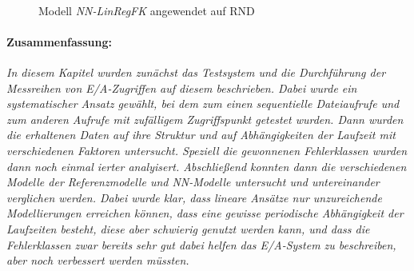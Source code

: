 \documentclass[
	12pt,
	a4paper,
	BCOR10mm,
	DIV14,
	listof=totoc,
	bibliography=totoc,
	headsepline
]{scrreprt}
\begin{document}
\begin{figure}
	\centering
	\\
	\vspace*{-0.21cm}
	\hfill
	\vspace*{-0.3cm}
	\caption{Modell \textit{NN-LinRegFK} angewendet auf RND}
	\label{fig:linregfk_rnd}
\end{figure} 

\paragraph{Zusammenfassung:}
\textit{
	In diesem Kapitel wurden zunächst das Testsystem und die Durchführung der Messreihen von E/A-Zugriffen auf diesem beschrieben.
	Dabei wurde ein systematischer Ansatz gewählt, bei dem zum einen sequentielle Dateiaufrufe und zum anderen Aufrufe mit zufälligem Zugriffspunkt getestet wurden.
	Dann wurden die erhaltenen Daten auf ihre Struktur und auf Abhängigkeiten der Laufzeit mit verschiedenen Faktoren untersucht.
	Speziell die gewonnenen Fehlerklassen wurden dann noch einmal ierter analyisert.
	Abschließend konnten dann die verschiedenen Modelle der Referenzmodelle und NN-Modelle untersucht und untereinander verglichen werden.
	Dabei wurde klar, dass lineare Ansätze nur unzureichende Modellierungen erreichen können, dass eine gewisse periodische Abhängigkeit der Laufzeiten besteht, diese aber schwierig genutzt werden kann, und dass die Fehlerklassen zwar bereits sehr gut dabei helfen das E/A-System zu beschreiben, aber noch verbessert werden müssten.
	}
\clearpage
\end{document}
